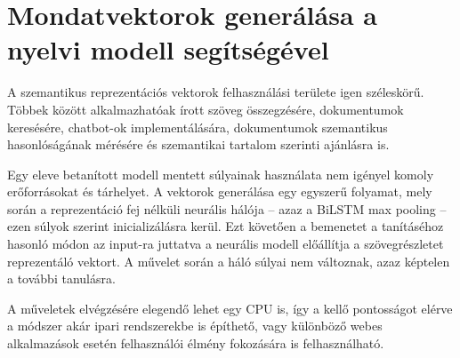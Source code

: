 \section{Mondatvektorok generálása a nyelvi modell segítségével}

A szemantikus reprezentációs vektorok felhasználási területe igen széleskörű. Többek között alkalmazhatóak írott szöveg összegzésére, dokumentumok keresésére, chatbot-ok implementálására, dokumentumok szemantikus hasonlóságának mérésére és szemantikai tartalom szerinti ajánlásra is.

Egy eleve betanított modell mentett súlyainak használata nem igényel komoly erőforrásokat és tárhelyet. A vektorok generálása egy egyszerű folyamat, mely során a reprezentáció fej nélküli neurális hálója – azaz a BiLSTM max pooling – ezen súlyok szerint inicializálásra kerül. Ezt követően a bemenetet a tanításéhoz hasonló módon az input-ra juttatva a neurális modell előállítja a szövegrészletet reprezentáló vektort. A művelet során a háló súlyai nem változnak, azaz képtelen a további tanulásra.

A műveletek elvégzésére elegendő lehet egy CPU is, így a kellő pontosságot elérve a módszer akár ipari rendszerekbe is építhető, vagy különböző webes alkalmazások esetén felhasználói élmény fokozására is felhasználható.
